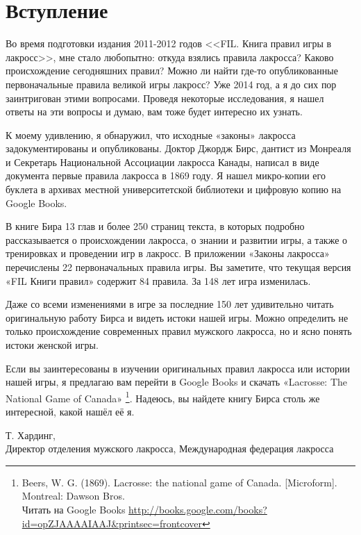 \documentclass[../main.tex]{subfiles}
\begin{document}
\section*{Вступление}
Во время подготовки издания 2011-2012 годов <<FIL. Книга правил игры в лакросс>>, мне стало любопытно: откуда взялись правила лакросса? Каково происхождение сегодняшних правил? Можно ли найти где-то опубликованные первоначальные правила великой игры лакросс? Уже 2014 год, а я до сих пор заинтригован этими вопросами. Проведя некоторые исследования, я нашел ответы на эти вопросы и думаю, вам тоже будет интересно их узнать.

К моему удивлению, я обнаружил, что исходные «законы» лакросса задокументированы и опубликованы. Доктор Джордж Бирс, дантист из Монреаля и Секретарь Национальной Ассоциации лакросса Канады, написал в виде документа первые правила лакросса в 1869 году. Я нашел микро-копии его буклета в архивах местной университетской библиотеки и цифровую копию на Google Books.

В книге Бира 13 глав и более 250 страниц текста, в которых подробно рассказывается о происхождении лакросса, о знании и развитии игры, а также о тренировках и проведении игр в лакросс. В приложении «Законы лакросса» перечислены 22 первоначальных правила игры.  Вы заметите, что текущая версия «FIL Книги правил» содержит 84 правила. За 148 лет игра изменилась.

Даже со всеми изменениями в игре за последние 150 лет удивительно читать оригинальную работу Бирса и видеть истоки нашей игры. Можно определить не только происхождение современных правил мужского лакросса, но и ясно понять истоки женской игры.

Если вы заинтересованы в изучении оригинальных правил лакросса или истории нашей игры, я предлагаю вам перейти в Google Books и скачать «Lacrosse: The National Game of Canada»
\footnote{\textenglish{Beers, W. G. (1869). Lacrosse: the national game of Canada. [Microform]. Montreal: Dawson Bros.}
\\ Читать на Google Books \textenglish{\url{http://books.google.com/books?id=opZJAAAAIAAJ\&printsec=frontcover}}}.
Надеюсь, вы найдете книгу Бирса столь же интересной, какой нашёл её я.

Т. Хардинг,\\ Директор отделения мужского лакросса, Международная федерация лакросса 
\end{document}
